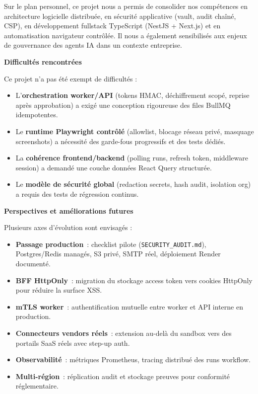 Sur le plan personnel, ce projet nous a permis de consolider nos
compétences en architecture logicielle distribuée, en sécurité
applicative (vault, audit chaîné, CSP), en développement fullstack
TypeScript (NestJS + Next.js) et en automatisation navigateur contrôlée.
Il nous a également sensibilisés aux enjeux de gouvernance des agents IA
dans un contexte entreprise.

\medskip
\noindent\textbf{\large Difficultés rencontrées}

\medskip
Ce projet n'a pas été exempt de difficultés :
\begin{itemize}[leftmargin=1.8cm, itemsep=3pt]
  \item L'\textbf{orchestration worker/API} (tokens HMAC, déchiffrement
    scopé, reprise après approbation) a exigé une conception rigoureuse
    des files BullMQ idempotentes.
  \item Le \textbf{runtime Playwright contrôlé} (allowlist, blocage
    réseau privé, masquage screenshots) a nécessité des garde-fous
    progressifs et des tests dédiés.
  \item La \textbf{cohérence frontend/backend} (polling runs, refresh
    token, middleware session) a demandé une couche données React Query
    structurée.
  \item Le \textbf{modèle de sécurité global} (redaction secrets, hash
    audit, isolation org) a requis des tests de régression continus.
\end{itemize}

\medskip
\noindent\textbf{\large Perspectives et améliorations futures}

\medskip
Plusieurs axes d'évolution sont envisagés :
\begin{itemize}[leftmargin=1.8cm, itemsep=3pt]
  \item \textbf{Passage production}~: checklist pilote
    (\texttt{SECURITY\_AUDIT.md}), Postgres/Redis managés, S3 privé,
    SMTP réel, déploiement Render documenté.
  \item \textbf{BFF HttpOnly}~: migration du stockage access token vers
    cookies HttpOnly pour réduire la surface XSS.
  \item \textbf{mTLS worker}~: authentification mutuelle entre worker et
    API interne en production.
  \item \textbf{Connecteurs vendors réels}~: extension au-delà du sandbox
    vers des portails SaaS réels avec step-up auth.
  \item \textbf{Observabilité}~: métriques Prometheus, tracing distribué
    des runs workflow.
  \item \textbf{Multi-région}~: réplication audit et stockage preuves pour
    conformité réglementaire.
\end{itemize}

